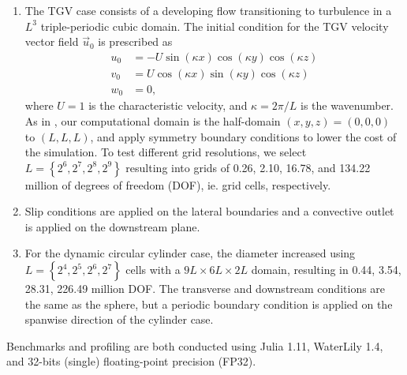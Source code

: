 \documentclass[10pt,a4paper]{article}
\begin{document}
\begin{enumerate}
\item The TGV case consists of a developing flow transitioning to turbulence in a $L^3$ triple-periodic cubic domain. The initial condition for the TGV velocity vector field $\vec{u}_0$ is prescribed as
\begin{align}
u_0 &= -U\sin(\kappa x)\cos(\kappa y)\cos(\kappa z) \\
v_0 &= U\cos(\kappa x)\sin(\kappa y)\cos(\kappa z) \\
w_0 &= 0,
\end{align}
where $U=1$ is the characteristic velocity, and $\kappa=2\pi/L$ is the wavenumber. As in \cite{Dairay2017}, our computational domain is the half-domain $(x,y,z)=(0,0,0)$ to $(L,L,L)$, and apply symmetry boundary conditions to lower the cost of the simulation. To test different grid resolutions, we select $L=\left\{2^6,2^7,2^8,2^9\right\}$ resulting into grids of 0.26, 2.10, 16.78, and 134.22 million of degrees of freedom (DOF), ie. grid cells, respectively.
\item {} Slip conditions are applied on the lateral boundaries and a convective outlet is applied on the downstream plane.
\item For the dynamic circular cylinder case, the diameter increased using $L=\left\{2^4,2^5,2^6,2^7\right\}$ cells with a $9L\times6L\times2L$ domain, resulting in 0.44, 3.54, 28.31, 226.49 million DOF.
The transverse and downstream conditions are the same as the sphere, but a periodic boundary condition is applied on the spanwise direction of the cylinder case.
\end{enumerate}
Benchmarks and profiling are both conducted using Julia 1.11, WaterLily 1.4, and 32-bits (single) floating-point precision (FP32).
\end{document}
